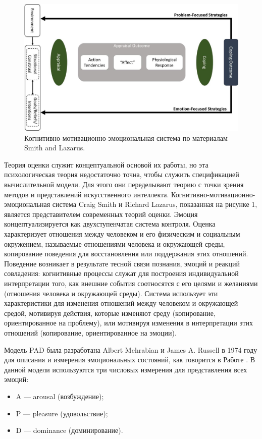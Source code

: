 \begin{figure}[h]
\includegraphics[width=0.75\columnwidth]{./img/ris1.png}
\centering
\caption{Когнитивно-мотивационно-эмоциональная система по материалам Smith and Lazarus.}
\label{pic:ris1}
\end{figure}

Теория оценки служит концептуальной основой их работы, но эта психологическая теория недостаточно точна, чтобы служить
спецификацией вычислительной модели. Для этого они переделывают теорию с точки зрения методов и представлений искусственного интеллекта. 
Когнитивно-мотивационно-эмоциональная система Craig Smith и Richard Lazarus, показанная на рисунке 1, является представителем современных
теорий оценки. Эмоция концептуализируется как двухступенчатая система контроля. Оценка характеризует отношения между человеком и его 
физическим и социальным окружением, называемые отношениями человека и окружающей среды, копирование поведения для восстановления или 
поддержания этих отношений. Поведение возникает в результате тесной связи познания, эмоций и реакций совладения: когнитивные процессы 
служат для построения индивидуальной интерпретации того, как внешние события соотносятся с его целями и желаниями 
(отношения человека и окружающей среды). Система использует эти характеристики для изменения отношений между человеком и окружающей средой,
мотивируя действия, которые изменяют среду (копирование, ориентированное на проблему), или мотивируя изменения в интерпретации этих 
отношений (копирование, ориентированное на эмоции).

Модель PAD была разработана Albert Mehrabian и James A. Russell в 1974 году для описания и измерения эмоциональных состояний, как говорится в Работе \cite{Samsonovich04}. 
В данной модели используются три числовых измерения для представления всех эмоций:
\begin{itemize}
	\item A — arousal (возбуждение);
	\item P — pleasure (удовольствие); 
	\item D — dominance (доминирование).
\end{itemize}

